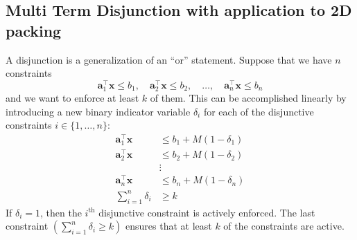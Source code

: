 \subsection{Multi Term Disjunction with application to 2D packing}
\label{subsec:multi-term-disjunction}

A disjunction is a generalization of an ``or'' statement. Suppose that we have $n$ constraints 
	$$
	\mathbf{a}_1^\top\mathbf{x} \leq b_1, \quad \mathbf{a}_2^\top\mathbf{x} \leq b_2, \quad\dots, \quad \mathbf{a}_n^\top\mathbf{x} \leq b_n
	$$
and we want to enforce at least $k$ of them. This can be accomplished linearly by introducing a new binary indicator variable $\delta_i$ for each of the disjunctive constraints $i \in \{1,\dots,n\}$:
	\begin{align*}
	\mathbf{a}_1^\top\mathbf{x} &\leq b_1+M(1-\delta_1) \\
	\mathbf{a}_2^\top\mathbf{x} &\leq b_2+M(1-\delta_2) \\
								&\vdots 				\\
	\mathbf{a}_n^\top\mathbf{x} &\leq b_n+M(1-\delta_n) \\
	\sum_{i=1}^n\delta_i &\geq k
	\end{align*}
If $\delta_i = 1$, then the $i^\text{th}$ disjunctive constraint is actively enforced. The last constraint $\left(\sum_{i=1}^n\delta_i \geq k\right)$ ensures that at least $k$ of the constraints are active.

